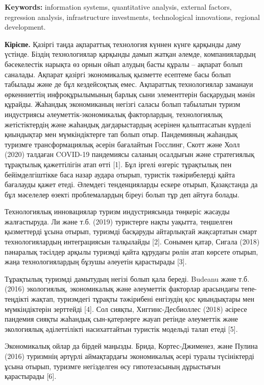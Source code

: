 {\bfseries Keywords:} information systems, quantitative analysis, external
factors, regression analysis, infrastructure investments, technological
innovations, regional development.

{\bfseries Кіріспе.} Қазіргі таңда ақпараттық технология күннен күнге
қарқынды даму үстінде. Біздің технологиялар қарқынды дамып жатқан
әлемде, компаниялардың бәсекелестік нарықта өз орнын ойып алудың басты
құралы -- ақпарат болып саналады. Ақпарат қазіргі экономикалық қызметте
есептеме басы болып табылады және де бұл кездейсоқтық емес. Ақпараттық
технологиялар заманауи өркенниеттің инфроқұрылымының барлық сыни
элементтерін басқарудың мәнін құрайды. Жаһандық экономиканың негізгі
саласы болып табылатын туризм индустриясы әлеуметтік-экономикалық
факторлардың, технологиялық жетістіктердің және жаһандық дағдарыстардың
әсерінен қалыптасатын күрделі қиындықтар мен мүмкіндіктерге тап болып
отыр. Пандемияның жаһандық туризмге трансформациялық әсерін бағалайтын
Госслинг, Скотт және Холл (2020) талдаған COVID-19 пандемиясы саланың
осалдығын және стратегиялық тұрақтылық қажеттілігін атап өтті {[}1{]}.
Бұл іргелі өзгеріс тұрақтылық пен бейімделгіштікке баса назар аудара
отырып, туристік тәжірибелерді қайта бағалауды қажет етеді. Әлемдегi
тенденцияларды ескере отырып, Қазақстанда да бұл мәселелер өзектi
проблемалардың бiреуi болып тұр деп айтуға болады.

Технологиялық инновациялар туризм индустриясында төңкеріс жасауды
жалғастыруда. Ли және т.б. (2019) туристерге нақты уақытта, теңшелген
қызметтерді ұсына отырып, туризмді басқаруды айтарлықтай жақсартатын
смарт технологиялардың интеграциясын талқылайды {[}2{]}. Сонымен қатар,
Сигала (2018) пәнаралық тәсілдер арқылы туризмді қайта құрудағы рөлін
атап көрсете отырып, жаңа технологиялардың бұзушы әлеуетін қарастырады
{[}3{]}.

Тұрақтылық туризмді дамытудың негізі болып қала береді. Budeanu және
т.б. (2016) экологиялық, экономикалық және әлеуметтік факторлар
арасындағы тепе-теңдікті жақтап, туризмдегі тұрақты тәжірибені енгізудің
қос қиындықтары мен мүмкіндіктерін зерттейді {[}4{]}. Сол сияқты,
Хиггинс-Десбиоллес (2018) әсіресе пандемия сияқты жаһандық
сын-қатерлерге жауап ретінде әлеуметтік және экологиялық әділеттілікті
насихаттайтын туристік модельді талап етеді {[}5{]}.

Экономикалық ойлар да бірдей маңызды. Брида, Кортес-Джименез, және
Пулина (2016) туризмнің әртүрлі аймақтардағы экономикалық әсері туралы
түсініктерді ұсына отырып, туризмге негізделген өсу гипотезасының
дұрыстығын қарастырады {[}6{]}.

